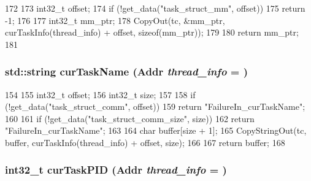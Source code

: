 \begin{DoxyCode}
172     {
173         int32_t offset;
174         if (!get_data("task_struct_mm", offset))
175             return -1;
176 
177         int32_t mm_ptr;
178         CopyOut(tc, &mm_ptr, curTaskInfo(thread_info) + offset, sizeof(mm_ptr));
179 
180         return mm_ptr;
181     }
\end{DoxyCode}
\hypertarget{classLinux_1_1ThreadInfo_a35e25daf337cac7b44d13cf92382f45e}{
\subsubsection[{curTaskName}]{\setlength{\rightskip}{0pt plus 5cm}std::string curTaskName ({\bf Addr} {\em thread\_\-info} = {})}}
\label{classLinux_1_1ThreadInfo_a35e25daf337cac7b44d13cf92382f45e}



\begin{DoxyCode}
154     {
155         int32_t offset;
156         int32_t size;
157 
158         if (!get_data("task_struct_comm", offset))
159             return "FailureIn_curTaskName";
160 
161         if (!get_data("task_struct_comm_size", size))
162             return "FailureIn_curTaskName";
163 
164         char buffer[size + 1];
165         CopyStringOut(tc, buffer, curTaskInfo(thread_info) + offset, size);
166 
167         return buffer;
168     }
\end{DoxyCode}
\hypertarget{classLinux_1_1ThreadInfo_a61cccca364818b8d499410a9b100d307}{
\subsubsection[{curTaskPID}]{\setlength{\rightskip}{0pt plus 5cm}int32\_\-t curTaskPID ({\bf Addr} {\em thread\_\-info} = {})}}
\label{classLinux_1_1ThreadInfo_a61cccca364818b8d499410a9b100d307}



